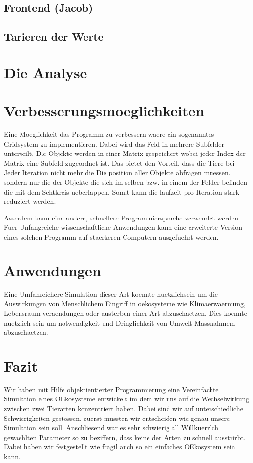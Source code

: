 \documentclass[12pt]{article}
\begin{document}
\subsection{Frontend (Jacob)}
\subsection{Tarieren der Werte}
\section{Die Analyse}
\section{Verbesserungsmoeglichkeiten}
Eine Moeglichkeit das Programm zu verbessern waere ein sogenanntes Gridsystem zu implementieren.
Dabei wird das Feld in mehrere Subfelder unterteilt.
Die Objekte werden in einer Matrix gespeichert wobei jeder Index der Matrix eine Subfeld zugeordnet ist.
Das bietet den Vorteil, dass die Tiere bei Jeder Iteration nicht mehr die Die position aller Objekte abfragen muessen, sondern nur die der Objekte die sich im selben bzw. in einem der Felder befinden die mit dem Schtkreis ueberlappen.
Somit kann die laufzeit pro Iteration stark reduziert werden.

Asserdem kann eine andere, schnellere Programmiersprache verwendet werden.
Fuer Unfangreiche wissenschaftliche Anwendungen kann eine erweiterte Version eines solchen Programm auf staerkeren Computern ausgefuehrt werden.
\section{Anwendungen}
Eine Umfanreichere Simulation dieser Art koennte nuetzlichsein um die Auswirkungen von Menschlichem Eingriff in oekosysteme wie Klimaerwaermung, Lebensraum veraendungen oder austerben einer Art abzuschaetzen.
Dies koennte nuetzlich sein um notwendigkeit und Dringlichkeit von Umwelt Massnahmem abzuschaetzen.
\section{Fazit}
Wir haben mit Hilfe objektientierter Programmierung eine Vereinfachte Simulation eines OEkosysteme entwickelt im dem wir uns auf die Wechselwirkung zwischen zwei Tierarten konzentriert haben.
Dabei sind wir auf unterschiedliche Schwierigkeiten gestossen.
zuerst mussten wir entscheiden wie genau unsere Simulation sein soll.
Anschliesend war es sehr schwierig all Willkuerrlch gewaehlten Parameter so zu beziffern, dass keine der Arten zu schnell ausstrirbt.
Dabei haben wir festgestellt wie fragil auch so ein einfaches OEkosystem sein kann.
\end{document}

